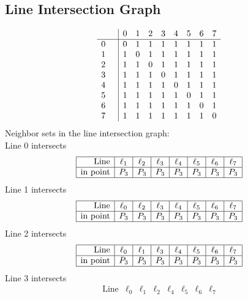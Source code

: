 \documentclass{article}
\begin{document}
{\subsection*{Line Intersection Graph}
{\arraycolsep=1pt
$$
\begin{array}{rr|*{8}r}
 &  & 0 & 1 & 2 & 3 & 4 & 5 & 6 & 7\\
\hline
0 &  & 0 & 1 & 1 & 1 & 1 & 1 & 1 & 1\\
1 &  & 1 & 0 & 1 & 1 & 1 & 1 & 1 & 1\\
2 &  & 1 & 1 & 0 & 1 & 1 & 1 & 1 & 1\\
3 &  & 1 & 1 & 1 & 0 & 1 & 1 & 1 & 1\\
4 &  & 1 & 1 & 1 & 1 & 0 & 1 & 1 & 1\\
5 &  & 1 & 1 & 1 & 1 & 1 & 0 & 1 & 1\\
6 &  & 1 & 1 & 1 & 1 & 1 & 1 & 0 & 1\\
7 &  & 1 & 1 & 1 & 1 & 1 & 1 & 1 & 0\\
\end{array}
$$
}%
Neighbor sets in the line intersection graph:\\
Line 0 intersects 
$$
\begin{array}{|r*{7}{|c}|}
\hline
\mbox{Line}  & \ell_{1} & \ell_{2} & \ell_{3} & \ell_{4} & \ell_{5} & \ell_{6} & \ell_{7}\\
\hline
\mbox{in point}  & P_{3} & P_{3} & P_{3} & P_{3} & P_{3} & P_{3} & P_{3}\\
\hline
\end{array}
$$
Line 1 intersects 
$$
\begin{array}{|r*{7}{|c}|}
\hline
\mbox{Line}  & \ell_{0} & \ell_{2} & \ell_{3} & \ell_{4} & \ell_{5} & \ell_{6} & \ell_{7}\\
\hline
\mbox{in point}  & P_{3} & P_{3} & P_{3} & P_{3} & P_{3} & P_{3} & P_{3}\\
\hline
\end{array}
$$
Line 2 intersects 
$$
\begin{array}{|r*{7}{|c}|}
\hline
\mbox{Line}  & \ell_{0} & \ell_{1} & \ell_{3} & \ell_{4} & \ell_{5} & \ell_{6} & \ell_{7}\\
\hline
\mbox{in point}  & P_{3} & P_{3} & P_{3} & P_{3} & P_{3} & P_{3} & P_{3}\\
\hline
\end{array}
$$
Line 3 intersects 
$$
\begin{array}{|r*{7}{|c}|}
\hline
\mbox{Line}  & \ell_{0} & \ell_{1} & \ell_{2} & \ell_{4} & \ell_{5} & \ell_{6} & \ell_{7}\\

\end{array}$$}
\end{document}
